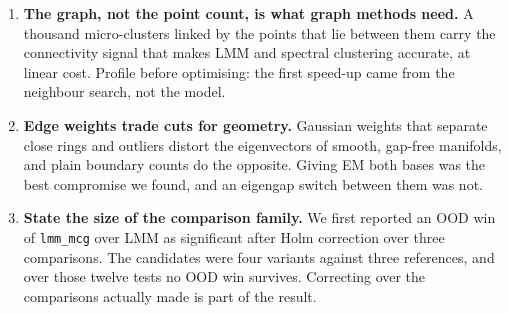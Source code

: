\documentclass[11pt,a4paper]{article}
\newcommand{\code}[1]{\texttt{#1}}
\begin{document}
\begin{enumerate}
  float parsed as a string, a missing default argument and git-ignored
  training files each removed rows from the benchmark without stopping it.
  Each missing row changed the means it was dropped from until it was
  root-caused.
  \item \textbf{The graph, not the point count, is what graph methods need.}
  A thousand micro-clusters linked by the points that lie between them carry
  the connectivity signal that makes LMM and spectral clustering accurate,
  at linear cost. Profile before optimising: the first speed-up came from
  the neighbour search, not the model.
  \item \textbf{Edge weights trade cuts for geometry.} Gaussian weights that
  separate close rings and outliers distort the eigenvectors of smooth,
  gap-free manifolds, and plain boundary counts do the opposite. Giving EM
  both bases was the best compromise we found, and an eigengap switch
  between them was not.
  \item \textbf{State the size of the comparison family.} We first reported
  an OOD win of \code{lmm\_mcg} over LMM as significant after Holm correction
  over three comparisons. The candidates were four variants against three
  references, and over those twelve tests no OOD win survives. Correcting
  over the comparisons actually made is part of the result.
\end{enumerate}
\end{document}
